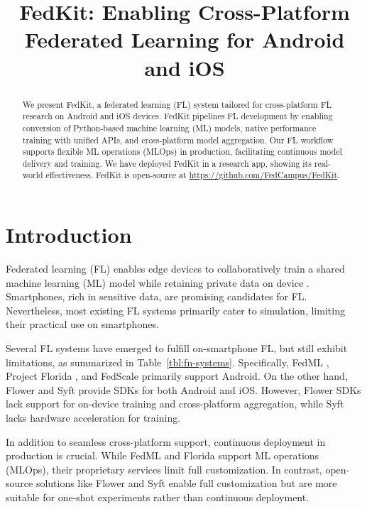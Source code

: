 \documentclass[letterpaper]{article} %
\title{FedKit: Enabling Cross-Platform Federated Learning for Android and iOS}
\author{}
\begin{document}
\maketitle

\begin{abstract}
    We present FedKit, a federated learning (FL) system tailored for
    cross-platform FL research on Android and iOS devices.
    FedKit pipelines FL development by
    enabling conversion of Python-based machine learning (ML) models,
    native performance training with unified APIs,
    and cross-platform model aggregation.
    Our FL workflow supports flexible ML operations (MLOps) in production,
    facilitating continuous model delivery and training.
    We have deployed FedKit in a research app,
    showing its real-world effectiveness.
    FedKit is open-source at \url{https://github.com/FedCampus/FedKit}.
\end{abstract}

\section{Introduction}

Federated learning (FL) enables edge devices to
collaboratively train a shared machine learning (ML) model while
retaining private data on device \cite{mcmahan2017communication}.
Smartphones, rich in sensitive data,
are promising candidates for FL.
Nevertheless, most existing FL systems
\cite[e.g.,][]{bonawitz2019towards,liu2021fate,ma2019paddlepaddle,openfl_citation}
primarily cater to simulation,
limiting their practical use on smartphones.

Several FL systems have emerged to fulfill on-smartphone FL,
but still exhibit limitations,
as summarized in Table~\ref{tbl:fn-systems}.
Specifically, FedML \cite{he2020fedml},
Project Florida \cite{madrigal2023project},
and FedScale \cite{lai2022fedscale} primarily support Android.
On the other hand,
Flower \cite{beutel2020flower,mathur2021ondevice} and
Syft \cite{ryffel2018generic,Ziller2021,hall2021syft}
provide SDKs for both Android and iOS.
However, Flower SDKs lack support for on-device training and
cross-platform aggregation,
while Syft lacks hardware acceleration for training.

In addition to seamless cross-platform support,
continuous deployment in production is crucial.
While FedML and Florida support ML operations (MLOps),
their proprietary services limit full customization.
In contrast, open-source solutions like Flower and Syft enable
full customization
but are more suitable for one-shot experiments rather than continuous deployment.
\end{document}

